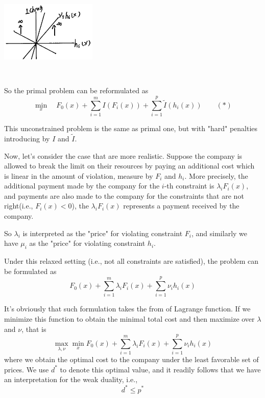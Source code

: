 \begin{marginfigure}
	\centering
	\includegraphics[width=1.8in,height=1.8in]{figures/ch10/figure1127_3.png}
\end{marginfigure}

So the primal problem can be reformulated as 
$$\min_x\quad F_0(x) + \sum^m_{i=1}I(F_i(x)) + \sum^p_{i=1}\tilde{I}(h_i(x)) \qquad (*)$$

This unconstrained problem is the same as primal one, but with "hard" penalties introducing by $I$ and $\tilde{I}$.

Now, let's consider the case that are more realistic. Suppose the company is allowed to break the limit on their resources by paying an additional cost which is linear in the amount of violation, measure by $F_i$ and $h_i$. More precisely, the additional payment made by the company for the $i$-th constraint is $\lambda_i F_i(x)$, and payments are also made to the company for the constraints that are not right(i.e., $F_i(x)<0$), the $\lambda_i F_i(x)$ represents a payment received by the company. 

So $\lambda_i$ is interpreted as the "price" for violating constraint $F_i$, and similarly we have $\mu_i$ as the "price" for violating constraint $h_i$.

Under this relaxed setting (i.e., not all constraints are satisfied), the problem can be formulated as 
$$F_0(x) + \sum^m_{i=1}\lambda_i F_i(x) + \sum^p_{i=1}\nu_i h_i(x)$$

It's obviously that such formulation takes the from of Lagrange function. If we minimize this function to obtain the minimal total cost and then maximize over $\lambda$ and $\nu$, that is
$$\max_{\lambda, \nu} \min_x F_0(x) + \sum^m_{i=1}\lambda_i F_i(x) + \sum^p_{i=1}\nu_i h_i(x)$$
where we obtain the optimal cost to the company under the least favorable set of prices. We use $d^*$ to denote this optimal value, and it readily follows that we have an interpretation for the weak duality, i.e.,
$$d^* \leq p^*$$


